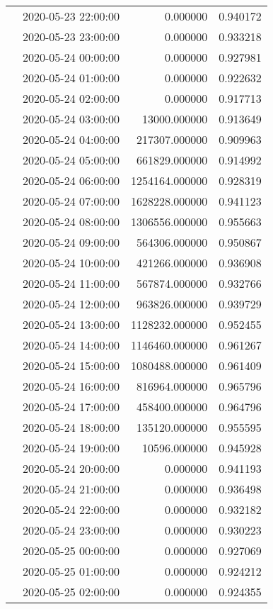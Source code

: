 \begin{tabular}{llrr}
 & 2020-05-23 22:00:00 & 0.000000 & 0.940172 \\
 & 2020-05-23 23:00:00 & 0.000000 & 0.933218 \\
 & 2020-05-24 00:00:00 & 0.000000 & 0.927981 \\
 & 2020-05-24 01:00:00 & 0.000000 & 0.922632 \\
 & 2020-05-24 02:00:00 & 0.000000 & 0.917713 \\
 & 2020-05-24 03:00:00 & 13000.000000 & 0.913649 \\
 & 2020-05-24 04:00:00 & 217307.000000 & 0.909963 \\
 & 2020-05-24 05:00:00 & 661829.000000 & 0.914992 \\
 & 2020-05-24 06:00:00 & 1254164.000000 & 0.928319 \\
 & 2020-05-24 07:00:00 & 1628228.000000 & 0.941123 \\
 & 2020-05-24 08:00:00 & 1306556.000000 & 0.955663 \\
 & 2020-05-24 09:00:00 & 564306.000000 & 0.950867 \\
 & 2020-05-24 10:00:00 & 421266.000000 & 0.936908 \\
 & 2020-05-24 11:00:00 & 567874.000000 & 0.932766 \\
 & 2020-05-24 12:00:00 & 963826.000000 & 0.939729 \\
 & 2020-05-24 13:00:00 & 1128232.000000 & 0.952455 \\
 & 2020-05-24 14:00:00 & 1146460.000000 & 0.961267 \\
 & 2020-05-24 15:00:00 & 1080488.000000 & 0.961409 \\
 & 2020-05-24 16:00:00 & 816964.000000 & 0.965796 \\
 & 2020-05-24 17:00:00 & 458400.000000 & 0.964796 \\
 & 2020-05-24 18:00:00 & 135120.000000 & 0.955595 \\
 & 2020-05-24 19:00:00 & 10596.000000 & 0.945928 \\
 & 2020-05-24 20:00:00 & 0.000000 & 0.941193 \\
 & 2020-05-24 21:00:00 & 0.000000 & 0.936498 \\
 & 2020-05-24 22:00:00 & 0.000000 & 0.932182 \\
 & 2020-05-24 23:00:00 & 0.000000 & 0.930223 \\
 & 2020-05-25 00:00:00 & 0.000000 & 0.927069 \\
 & 2020-05-25 01:00:00 & 0.000000 & 0.924212 \\
 & 2020-05-25 02:00:00 & 0.000000 & 0.924355 \\

\end{tabular}
